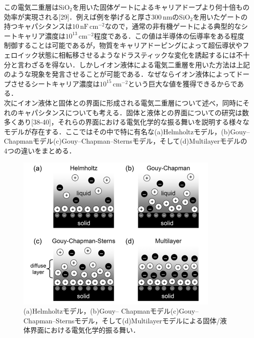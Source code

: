 この電気二重層はSiO$_{2}$を用いた固体ゲートによるキャリアドープより何十倍もの効率が実現される[29]．例えば例を挙げると厚さ$300\,\mathrm{nm}$のSiO$_{2}$を用いたゲートの持つキャパシタンスは$10\,\mathrm{nF\,\mathrm{cm^{-2}}}$なので，通常の非有機ゲートによる典型的なシートキャリア濃度は$10^{13}\,\mathrm{cm^{-2}}$程度である．この値は半導体の伝導率をある程度制御することは可能であるが，物質をキャリアドーピングによって超伝導状やフェロイック状態に相転移させるようなドラスティックな変化を誘起するには不十分と言わざるを得ない．しかしイオン液体による電気二重層を用いた方法は上記のような現象を発言させることが可能である．なぜならイオン液体によってドープさせるシートキャリア濃度は$10^{15}\,\mathrm{cm^{-2}}$という巨大な値を獲得できるからである．\\
次にイオン液体と固体との界面に形成される電気二重層について述べ，同時にそれのキャパシタンスについても考える．固体と液体との界面についての研究は数多くあり[38-40]，それらの界面における電気化学的な振る舞いを説明する様々なモデルが存在する．ここではその中で特に有名な(a)Helmholtzモデル，(b)Gouy– Chapmanモデル(c)Gouy–Chapman–Sternsモデル，そして(d)Multilayerモデルの4つの違いをまとめる．\\


\begin{figure}[t]
 \begin{center}
  \includegraphics[width=100mm]{images/electrochemicalmodels.png}
\end{center}
 \caption{(a)Helmholtzモデル，(b)Gouy– Chapmanモデル(c)Gouy–Chapman–Sternsモデル，そして(d)Multilayerモデルによる固体/液体界面における電気化学的振る舞い．}
 \label{electrochemicalmodels}
\end{figure}


